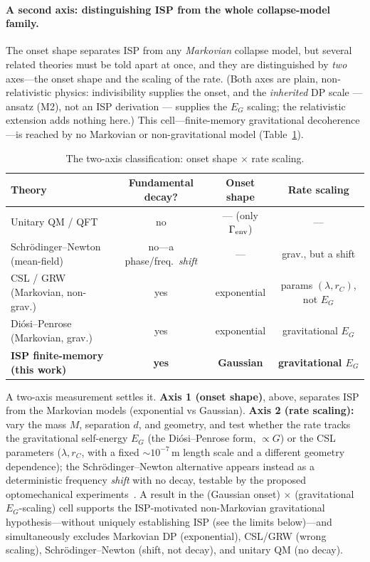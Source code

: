 \documentclass[aps,prd,onecolumn,amsmath,amssymb,nofootinbib,superscriptaddress]{revtex4-2}
\begin{document}
\paragraph{A second axis: distinguishing ISP from the whole collapse-model family.} The onset shape
separates ISP from any \emph{Markovian} collapse model, but several related theories must be told
apart at once, and they are distinguished by \emph{two} axes---the onset shape and the scaling of the
rate. (Both axes are plain, non-relativistic physics: indivisibility supplies the onset, and the
\emph{inherited} DP scale --- ansatz (M2), not an ISP derivation --- supplies the $E_G$ scaling;
the relativistic extension adds nothing here.)
This cell---finite-memory gravitational decoherence---is reached by no Markovian or non-gravitational
model (Table~\ref{tab:twoaxis}).

\begin{table}[h]
\centering
\caption{The two-axis classification: onset shape $\times$ rate scaling.}\label{tab:twoaxis}
\begin{tabular}{lccc}
\hline\hline
Theory & Fundamental decay? & Onset shape & Rate scaling \\
\hline
Unitary QM / QFT & no & --- (only $\Gamma_{\rm env}$) & --- \\
Schr\"odinger--Newton (mean-field)~\cite{R24} & no---a phase/freq.\ \emph{shift} & --- & grav., but a shift \\
CSL / GRW (Markovian, non-grav.)~\cite{R4,R5} & yes & exponential & params $(\lambda,r_C)$, not $E_G$ \\
Di\'osi--Penrose (Markovian, grav.)~\cite{R1,R2} & yes & exponential & gravitational $E_G$ \\
\textbf{ISP finite-memory (this work)} & \textbf{yes} & \textbf{Gaussian} & \textbf{gravitational $E_G$} \\
\hline\hline
\end{tabular}
\end{table}

A two-axis measurement settles it. \textbf{Axis 1 (onset shape)}, above, separates ISP from the
Markovian models (exponential vs Gaussian). \textbf{Axis 2 (rate scaling):} vary the mass $M$,
separation $d$, and geometry, and test whether the rate tracks the gravitational self-energy $E_G$
(the Di\'osi--Penrose form, $\propto G$) or the CSL parameters ($\lambda,r_C$, with a fixed
$\sim10^{-7}\,$m length scale and a different geometry dependence); the Schr\"odinger--Newton
alternative appears instead as a deterministic frequency \emph{shift} with no decay, testable by
the proposed optomechanical experiments~\cite{R24}. A result in the (Gaussian onset) $\times$ (gravitational
$E_G$-scaling) cell supports the ISP-motivated non-Markovian gravitational hypothesis---without
uniquely establishing ISP (see the limits below)---and simultaneously excludes Markovian DP
(exponential), CSL/GRW (wrong scaling), Schr\"odinger--Newton (shift, not decay), and unitary QM (no
decay).
\end{document}
